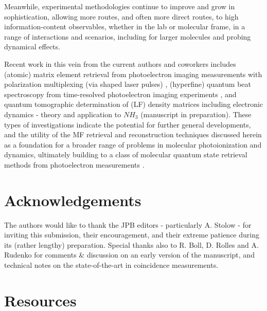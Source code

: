 \documentclass[10pt]{article}
\begin{document}
Meanwhile, experimental methodologies continue to improve and grow in sophistication, allowing more routes, and often more direct routes, to high information-content observables, whether in the lab or molecular frame, in a range of interactions and scenarios, including for larger molecules and probing dynamical effects. 


Recent work in this vein from the current authors and coworkers includes (atomic) matrix element retrieval from photoelectron imaging measurements with polarization multiplexing (via shaped laser pulses) \cite{hockett2014CompletePhotoionizationExperiments, hockett2015MaximuminformationPhotoelectronMetrology,hockett2015CoherentControlPhotoelectron, hockett2015CompletePhotoionizationExperiments}, (hyperfine) quantum beat spectroscopy from time-resolved photoelectron imaging experiments \cite{forbes2018QuantumbeatPhotoelectronimagingSpectroscopy}, and quantum tomographic determination of (LF) density matrices including electronic dynamics - theory \cite{gregory2022LaboratoryFrameDensity} and application to $NH_3$ (manuscript in preparation). These types of investigations indicate the potential for further general developments, and the utility of the MF retrieval and reconstruction techniques discussed herein as a foundation for a broader range of problems in molecular photoionization and dynamics, ultimately building to a class of molecular quantum state retrieval methods from photoelectron measurements \cite{hockett2018QMP1, hockett2018QMP2}. 





\section{Acknowledgements}

The authors would like to thank the JPB editors - particularly A. Stolow - for inviting this submission, their encouragement, and their extreme patience during its (rather lengthy) preparation. Special thanks also to R. Boll, D. Rolles and A. Rudenko for comments \& discussion on an early version of the manuscript, and technical notes on the state-of-the-art in coincidence measurements.
\section{Resources\label{sec:resources}}
\end{document}
